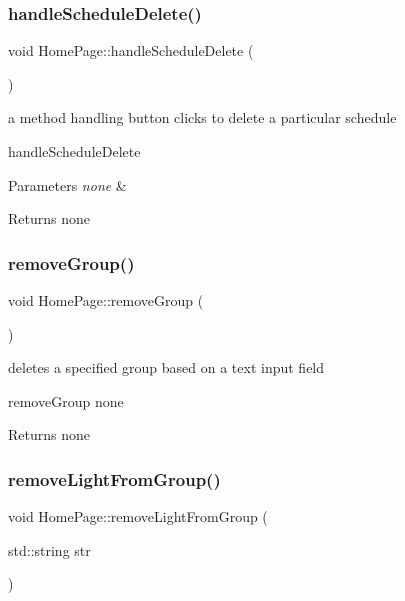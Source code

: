 \subsubsection{\texorpdfstring{handle\+Schedule\+Delete()}{handleScheduleDelete()}}
{\footnotesize\ttfamily void Home\+Page\+::handle\+Schedule\+Delete (\begin{DoxyParamCaption}{ }\end{DoxyParamCaption})\hspace{0.3cm}{\ttfamily [private]}}



a method handling button clicks to delete a particular schedule 

handle\+Schedule\+Delete 
\begin{DoxyParams}{Parameters}
{\em none} & \\
\hline
\end{DoxyParams}
\begin{DoxyReturn}{Returns}
none 
\end{DoxyReturn}
\mbox{\label{class_home_page_a019ab5ef1587a197837badfc32725af8}} 
\subsubsection{\texorpdfstring{remove\+Group()}{removeGroup()}}
{\footnotesize\ttfamily void Home\+Page\+::remove\+Group (\begin{DoxyParamCaption}{ }\end{DoxyParamCaption})}



deletes a specified group based on a text input field 

remove\+Group  none \begin{DoxyReturn}{Returns}
none 
\end{DoxyReturn}
\mbox{\label{class_home_page_ace0313d818ae7561f7707c6fa74f630b}} 
\subsubsection{\texorpdfstring{remove\+Light\+From\+Group()}{removeLightFromGroup()}}
{\footnotesize\ttfamily void Home\+Page\+::remove\+Light\+From\+Group (\begin{DoxyParamCaption}\item[{std\+::string}]{str }\end{DoxyParamCaption})}



